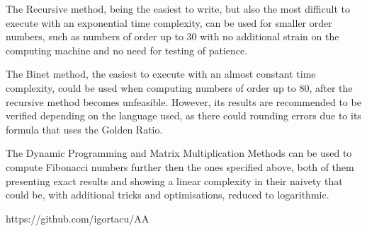 \documentclass[12pt]{article}
\begin{document}
The Recursive method, being the easiest to write, but also the most difficult to execute with an 
exponential time complexity, can be used for smaller order numbers, such as numbers of order up to 30 
with no additional strain on the computing machine and no need for testing of patience. 

The Binet method, the easiest to execute with an almost constant time complexity, could be used 
when computing numbers of order up to 80, after the recursive method becomes unfeasible. However, its 
results are recommended to be verified depending on the language used, as there could rounding errors due 
to its formula that uses the Golden Ratio. 

The Dynamic Programming and Matrix Multiplication Methods can be used to compute Fibonacci 
numbers further then the ones specified above, both of them presenting exact results and showing a linear 
complexity in their naivety that could be, with additional tricks and optimisations, reduced to logarithmic.  


https://github.com/igortacu/AA

\pagebreak
\end{document}
